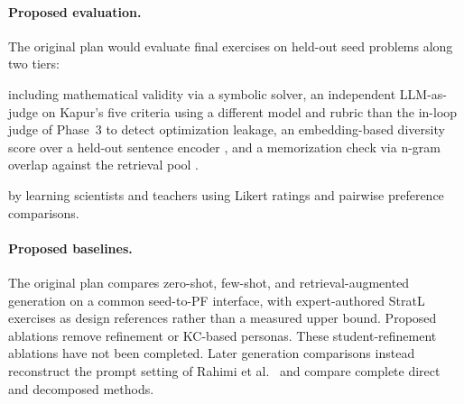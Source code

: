 \paragraph{Proposed evaluation.} The original plan would evaluate final exercises on held-out seed problems along two tiers:
\begin{description}
    \setlength{\itemsep}{0.3em}
    \item[\textbf{(i) Automatic metrics}] including mathematical validity via a symbolic solver, an independent LLM-as-judge \cite{zheng2023judging} on Kapur's five criteria using a different model and rubric than the in-loop judge of Phase~3 to detect optimization leakage, an embedding-based diversity score over a held-out sentence encoder \cite{tevet2021diversity}, and a memorization check via n-gram overlap against the retrieval pool \cite{carlini2023memorization}.
    \item[\textbf{(ii) Human expert evaluation}] by learning scientists and teachers using Likert ratings and pairwise preference comparisons.
\end{description}

\paragraph{Proposed baselines.} The original plan compares zero-shot, few-shot, and retrieval-augmented generation on a common seed-to-PF interface, with expert-authored StratL exercises as design references rather than a measured upper bound. Proposed ablations remove refinement or KC-based personas. These student-refinement ablations have not been completed. Later generation comparisons instead reconstruct the prompt setting of Rahimi et al.~\cite{rahimi2025} and compare complete direct and decomposed methods.
